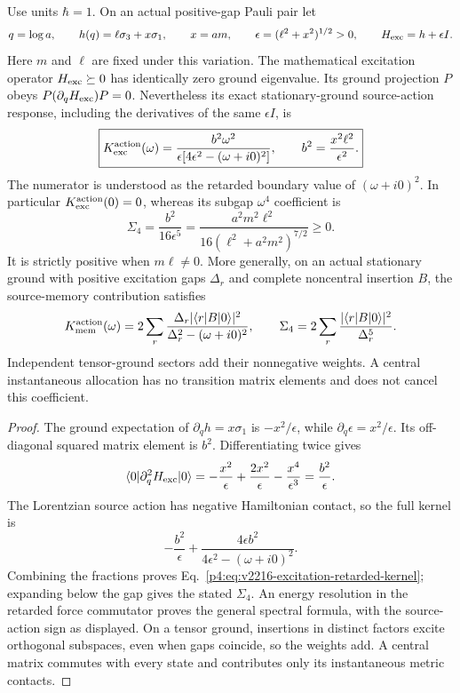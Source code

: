 \documentclass[12pt,a4paper]{article}
\begin{document}
\begin{theorem}
\label{p4:thm:v2216-zero-excitation-dynamic-response}
Use units $\hbar=1$. On an actual positive-gap Pauli pair let
\[
 q=\log a,\qquad h(q)=\ell\sigma_3+x\sigma_1,\qquad
 x=am,\qquad \epsilon=(\ell^2+x^2)^{1/2}>0,
 \qquad H_{\rm exc}=h+\epsilon I.
\]
Here $m$ and $\ell$ are fixed under this variation. The mathematical
excitation operator $H_{\rm exc}\succeq0$ has identically zero ground
eigenvalue. Its ground projection $P$ obeys
$P(\partial_qH_{\rm exc})P=0$. Nevertheless its exact stationary-ground
source-action response, including the derivatives of the same $\epsilon I$,
is
\begin{equation}
\label{p4:eq:v2216-excitation-retarded-kernel}
 \boxed{K_{\rm exc}^{\rm action}(\omega)
 =\frac{b^2\omega^2}
 {\epsilon[4\epsilon^2-(\omega+i0)^2]},\qquad
 b^2=\frac{x^2\ell^2}{\epsilon^2}.}
\end{equation}
The numerator is understood as the retarded boundary value of
$(\omega+i0)^2$. In particular $K_{\rm exc}^{\rm action}(0)=0$, whereas
its subgap $\omega^4$ coefficient is
\[
 \boxed{\Sigma_4=\frac{b^2}{16\epsilon^5}
 =\frac{a^2m^2\ell^2}{16(\ell^2+a^2m^2)^{7/2}}\ge0.}
\]
It is strictly positive when $m\ell\ne0$. More generally, on an actual
stationary ground with positive excitation gaps $\Delta_r$ and complete
noncentral insertion $B$, the source-memory contribution satisfies
\[
 K_{\rm mem}^{\rm action}(\omega)
 =2\sum_r\frac{\Delta_r|\langle r|B|0\rangle|^2}
 {\Delta_r^2-(\omega+i0)^2},\qquad
 \Sigma_4=2\sum_r\frac{|\langle r|B|0\rangle|^2}{\Delta_r^5}.
\]
Independent tensor-ground sectors add their nonnegative weights. A central
instantaneous allocation has no transition matrix elements and does not
cancel this coefficient.
\end{theorem}
\begin{proof}
The ground expectation of $\partial_qh=x\sigma_1$ is
$-x^2/\epsilon$, while $\partial_q\epsilon=x^2/\epsilon$.
Its off-diagonal squared matrix element is $b^2$. Differentiating twice
gives
\[
 \langle0|\partial_q^2H_{\rm exc}|0\rangle
 =-\frac{x^2}{\epsilon}
   +\frac{2x^2}{\epsilon}-\frac{x^4}{\epsilon^3}
 =\frac{b^2}{\epsilon}.
\]
The Lorentzian source action has negative Hamiltonian contact, so the full
kernel is
\[
 -\frac{b^2}{\epsilon}
 +\frac{4\epsilon b^2}{4\epsilon^2-(\omega+i0)^2}.
\]
Combining the fractions proves
Eq.~\eqref{p4:eq:v2216-excitation-retarded-kernel}; expanding below the
gap gives the stated $\Sigma_4$. An energy resolution in the retarded
force commutator proves the general spectral formula, with the source-action
sign as displayed. On a tensor ground, insertions in distinct factors excite
orthogonal subspaces, even when gaps coincide, so the weights add. A central
matrix commutes with every state and contributes only its instantaneous
metric contacts.
\end{proof}
\end{document}
